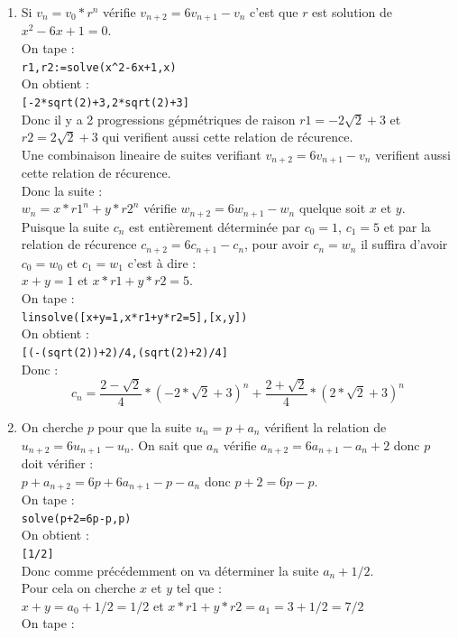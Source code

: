 \documentclass[a4paper,11pt]{book}
\begin{document}
\begin{enumerate}
{\tt [0,1,1],[3,4,5],[20,21,29],[119,120,169],[696,697,985], [4059,4060,5741]}
\item
Si $v_n=v_0*r^n$ v\'erifie $v_{n+2}=6v_{n+1}-v_n$ c'est que $r$ est solution de 
$x^2-6x+1=0$.\\
On tape :\\
{\tt r1,r2:=solve(x\verb|^|2-6x+1,x)}\\
On obtient :\\
{\tt [-2*sqrt(2)+3,2*sqrt(2)+3]}\\
Donc il y a 2 progressions g\'epm\'etriques de raison $r1=-2\sqrt 2+3$ et
$r2=2\sqrt 2+3$ qui verifient aussi cette relation de r\'ecurence.\\
Une combinaison lineaire de suites verifiant 
$v_{n+2}=6v_{n+1}-v_n$  verifient aussi cette relation de r\'ecurence.\\
Donc la suite :\\
$w_n=x*r1^n+y*r2^n$ v\'erifie $w_{n+2}=6w_{n+1}-w_n $ quelque soit $x$ et $y$.\\
Puisque la suite $c_n$ est enti\`erement d\'etermin\'ee par $c_0=1$, $c_1=5$ et 
par la relation de r\'ecurence $c_{n+2}=6c_{n+1}-c_n$, pour avoir $c_n=w_n$ il 
suffira d'avoir $c_0=w_0$ et $c_1=w_1$ c'est \`a dire :\\
$x+y=1$ et $x*r1+y*r2=5$.\\
On tape :\\
{\tt linsolve([x+y=1,x*r1+y*r2=5],[x,y])}\\
On obtient :\\
{\tt [(-(sqrt(2))+2)/4,(sqrt(2)+2)/4]}\\
Donc :
$$c_n=\frac{2-\sqrt 2}{4}*(-2*\sqrt 2+3)^n+\frac{2+\sqrt 2}{4}*(2*\sqrt 2+3)^n$$
\item
On cherche $p$ pour que la suite $u_n=p+a_n$ v\'erifient la 
relation de $u_{n+2}=6u_{n+1}-u_n$.
On sait que $a_n$ v\'erifie $a_{n+2}=6a_{n+1}-a_n+2$ donc $p$ doit v\'erifier :\\
$p+a_{n+2}=6p+6a_{n+1}-p-a_n$ donc $p+2=6p-p$.\\
On tape :\\
{\tt solve(p+2=6p-p,p)}\\
On obtient :\\
{\tt [1/2]}\\
Donc comme pr\'ec\'edemment on va d\'eterminer la suite $a_n+1/2$.\\
Pour cela  on cherche $x$ et $y$ tel que :\\
$x+y=a_0+1/2=1/2$ et $x*r1+y*r2=a_1=3+1/2=7/2$\\
On tape :\\

\end{enumerate}
\end{document}

